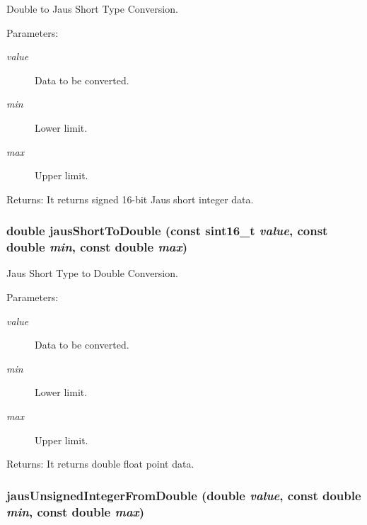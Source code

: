 Double to Jaus Short Type Conversion. 

\begin{Desc}
\item[Parameters:]
\begin{description}
\item[{\em value}]Data to be converted. \item[{\em min}]Lower limit. \item[{\em max}]Upper limit.\end{description}
\end{Desc}
\begin{Desc}
\item[Returns:]It returns signed 16-bit Jaus short integer data. \end{Desc}
\hypertarget{group__data__conv_g0a3aeb6d4da64c5a56f94c711e3a35bb}{
\subsubsection[jausShortToDouble]{\setlength{\rightskip}{0pt plus 5cm}double jausShortToDouble (const {\bf sint16\_\-t} {\em value}, \/  const double {\em min}, \/  const double {\em max})}}
\label{group__data__conv_g0a3aeb6d4da64c5a56f94c711e3a35bb}


Jaus Short Type to Double Conversion. 

\begin{Desc}
\item[Parameters:]
\begin{description}
\item[{\em value}]Data to be converted. \item[{\em min}]Lower limit. \item[{\em max}]Upper limit.\end{description}
\end{Desc}
\begin{Desc}
\item[Returns:]It returns double float point data. \end{Desc}
\hypertarget{group__data__conv_g4316bdd79d655a1ac80c1263ffd324cb}{
\subsubsection[jausUnsignedIntegerFromDouble]{ jausUnsignedIntegerFromDouble (double {\em value}, \/  const double {\em min}, \/  const double {\em max})}}
\label{group__data__conv_g4316bdd79d655a1ac80c1263ffd324cb}


